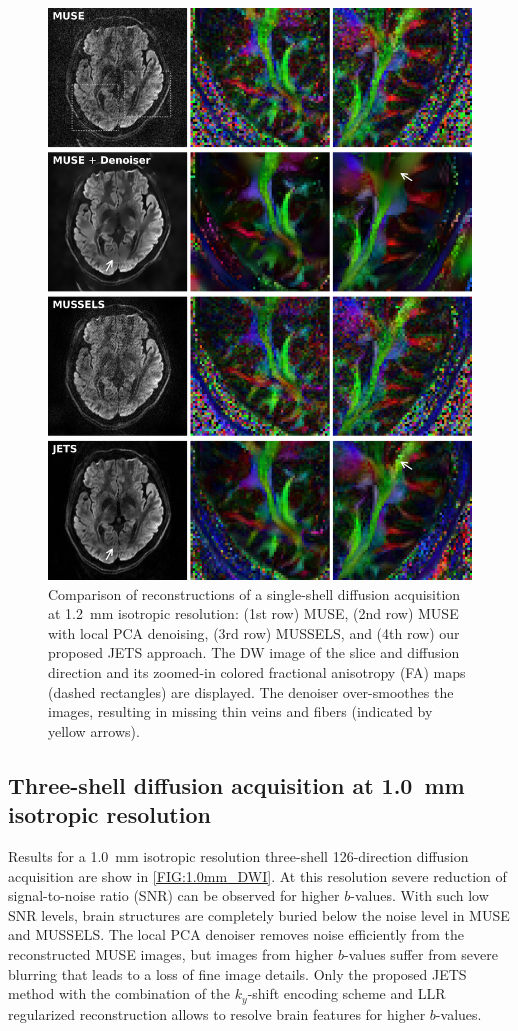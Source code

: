 \documentclass[preprint,12pt,authoryear,review]{elsarticle}
\begin{document}
	\begin{figure}
		\centering
		\includegraphics[width=0.85\linewidth]{../figures/fig2.png}
		\caption{Comparison of reconstructions of a
			single-shell diffusion acquisition at
			\SI{1.2}{\milli\meter} isotropic resolution:
			(1st row) MUSE,
			(2nd row) MUSE with local PCA denoising,
			(3rd row) MUSSELS, and
			(4th row) our proposed JETS approach.
			The DW image of the  slice and  diffusion direction
			and its zoomed-in colored fractional anisotropy (FA) maps (dashed rectangles) are displayed.
			The denoiser over-smoothes the images,
			resulting in missing thin veins and fibers (indicated by yellow arrows).}
		\label{FIG:1.2mm_DWI_cFA}
	\end{figure}


	\subsection{Three-shell diffusion acquisition at \SI{1.0}{\milli\meter} isotropic resolution}

	Results for a \SI{1.0}{mm} isotropic resolution three-shell 126-direction
	diffusion acquisition are show in \cref{FIG:1.0mm_DWI}. At this resolution severe reduction of signal-to-noise ratio (SNR) can be observed for higher $b$-values. With such low SNR levels, brain structures are completely buried below the noise level in MUSE and MUSSELS. The local PCA denoiser removes noise efficiently from the reconstructed MUSE images, but images from higher $b$-values suffer from severe blurring that leads to a loss of fine image details. Only the proposed JETS method with the combination of the $k_y$-shift encoding scheme and LLR regularized reconstruction allows to resolve brain features for higher $b$-values.
\end{document}
